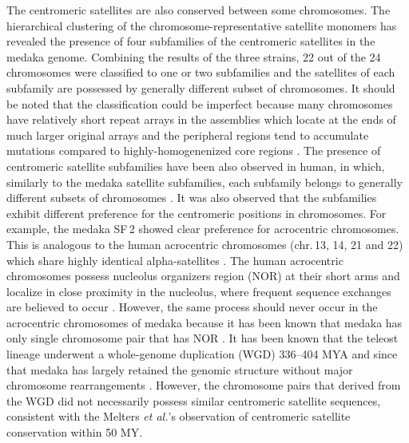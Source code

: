 The centromeric satellites are also conserved between some chromosomes. The hierarchical clustering of the chromosome-representative satellite monomers has revealed the presence of four subfamilies of the centromeric satellites in the medaka genome. Combining the results of the three strains, 22 out of the 24 chromosomes were classified to one or two subfamilies and the satellites of each subfamily are possessed by generally different subset of chromosomes. It should be noted that the classification could be imperfect because many chromosomes have relatively short repeat arrays in the assemblies which locate at the ends of much larger original arrays and the peripheral regions tend to accumulate mutations compared to highly-homogenenized core regions \cite{Smith1976, Schueler2001}. The presence of centromeric satellite subfamilies have been also observed in human, in which, similarly to the medaka satellite subfamilies, each subfamily belongs to generally different subsets of chromosomes \cite{Alexandrov2001}. It was also observed that the subfamilies exhibit different preference for the centromeric positions in chromosomes. For example, the medaka SF\,2 showed clear preference for acrocentric chromosomes. This is analogous to the human acrocentric chromosomes (chr.\,13, 14, 21 and 22) which share highly identical alpha-satellites \cite{Willard1991}. The human acrocentric chromosomes possess nucleolus organizers region (NOR) at their short arms and localize in close proximity in the nucleolus, where frequent sequence exchanges are believed to occur \cite{Willard1991}. However, the same process should never occur in the acrocentric chromosomes of medaka because it has been known that medaka has only single chromosome pair that has NOR \cite{Uwa1990}. It has been known that the teleost lineage underwent a whole-genome duplication (WGD) 336--404 MYA and since that medaka has largely retained the genomic structure without major chromosome rearrangements \cite{Kasahara2007}. However, the chromosome pairs that derived from the WGD did not necessarily possess similar centromeric satellite sequences, consistent with the Melters \textit{et al.}'s observation of centromeric satellite conservation within 50 MY.

